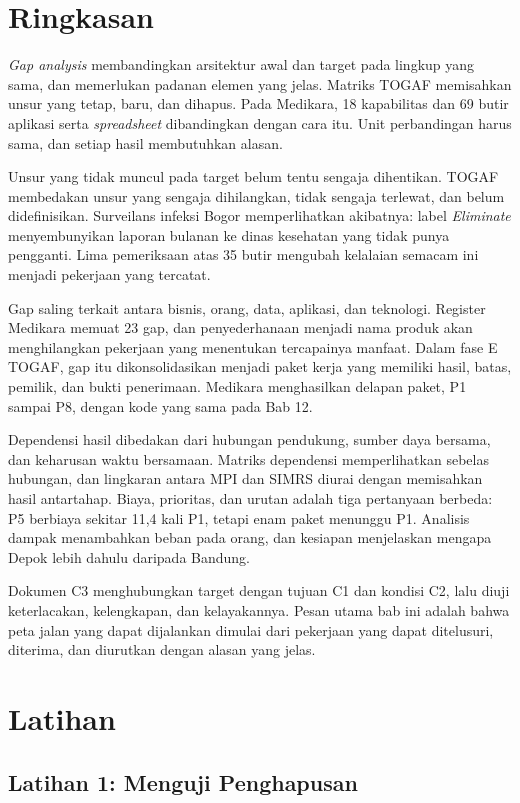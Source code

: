 \section{Ringkasan}

\textit{Gap analysis} membandingkan arsitektur awal dan target pada lingkup yang sama, dan memerlukan padanan elemen yang
jelas. Matriks TOGAF memisahkan unsur yang tetap, baru, dan dihapus. Pada Medikara, 18 kapabilitas dan 69 butir aplikasi serta
\textit{spreadsheet} dibandingkan dengan cara itu. Unit perbandingan harus sama, dan setiap hasil membutuhkan alasan.

Unsur yang tidak muncul pada target belum tentu sengaja dihentikan. TOGAF membedakan unsur yang sengaja dihilangkan, tidak
sengaja terlewat, dan belum didefinisikan. Surveilans infeksi Bogor memperlihatkan akibatnya: label \textit{Eliminate}
menyembunyikan laporan bulanan ke dinas kesehatan yang tidak punya pengganti. Lima pemeriksaan atas 35 butir mengubah kelalaian
semacam ini menjadi pekerjaan yang tercatat.

Gap saling terkait antara bisnis, orang, data, aplikasi, dan teknologi. Register Medikara memuat 23 gap, dan penyederhanaan
menjadi nama produk akan menghilangkan pekerjaan yang menentukan tercapainya manfaat. Dalam fase E TOGAF, gap itu dikonsolidasikan
menjadi paket kerja yang memiliki hasil, batas, pemilik, dan bukti penerimaan. Medikara menghasilkan delapan paket, P1 sampai P8,
dengan kode yang sama pada Bab 12.

Dependensi hasil dibedakan dari hubungan pendukung, sumber daya bersama, dan keharusan waktu bersamaan. Matriks dependensi
memperlihatkan sebelas hubungan, dan lingkaran antara MPI dan SIMRS diurai dengan memisahkan hasil antartahap. Biaya, prioritas,
dan urutan adalah tiga pertanyaan berbeda: P5 berbiaya sekitar 11,4 kali P1, tetapi enam paket menunggu P1. Analisis dampak
menambahkan beban pada orang, dan kesiapan menjelaskan mengapa Depok lebih dahulu daripada Bandung.

Dokumen C3 menghubungkan target dengan tujuan C1 dan kondisi C2, lalu diuji keterlacakan, kelengkapan, dan kelayakannya. Pesan
utama bab ini adalah bahwa peta jalan yang dapat dijalankan dimulai dari pekerjaan yang dapat ditelusuri, diterima, dan diurutkan
dengan alasan yang jelas.

\section{Latihan}
\subsection*{Latihan 1: Menguji Penghapusan}

